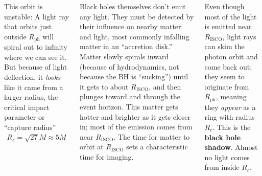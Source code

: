 \documentclass[25pt, a0paper, landscape]{tikzposter}
\begin{document}
\begin{columns}
{      This orbit is unstable: A light ray that orbits just outside
      $R_{\text{ph}}$ will spiral out to infinity where we can see it. But
      because of light deflection, it \emph{looks} like it came from a larger
      radius, the critical impact parameter or ``capture radius''
      \begin{align*}
        R_{c} =\sqrt{27}M \approx 5M
      \end{align*}

      Black holes themselves don’t emit any light. They must be
      detected by their influence on nearby matter and light, most
      commonly infalling matter in an ``accretion disk.'' Matter
      slowly spirals inward (because of hydrodynamics, not because the
      BH is ``sucking'') until it gets to about $R_{\text{ISCO}}$, and
      then plunges toward and through the event horizon. This
      matter gets hotter and brighter as it gets closer in; most of
      the emission comes from near $R_{\text{ISCO}}$. The time for
      matter to orbit at $R_{\text{ISCO}}$ sets a characteristic time for imaging.

      Even though most of the light is emitted near $R_{\text{ISCO}}$,
      light rays can skim the photon orbit and come back out; they
      seem to originate from $R_{\text{ph}}$, meaning they \emph{appear} as a
      ring with radius $R_{c}$. This is the \textbf{black hole
        shadow}. Almost no light comes from inside $R_c$.
    }

\end{columns}
\end{document}
